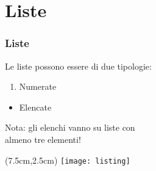 \section{Liste}
\begin{frame}
 \frametitle{Liste}
 
 Le liste possono essere di due tipologie:
 \begin{enumerate}
  \item Numerate
 \end{enumerate}
 \begin{itemize}
  \item Elencate
 \end{itemize}

 Nota: gli elenchi vanno su liste con \\ almeno tre elementi!
 
 \begin{textblock*}{5cm}(7.5cm,2.5cm)
   \texttt{[image: listing]}
 \end{textblock*}

\end{frame}
